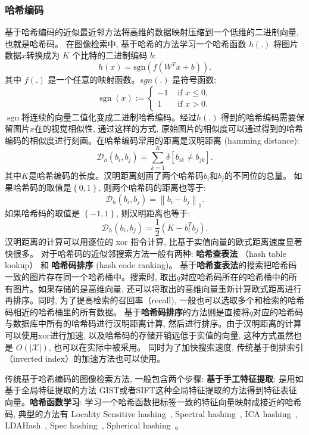 \subsubsection{哈希编码}
基于哈希编码的近似最近邻方法将高维的数据映射压缩到一个低维的二进制向量, 也就是哈希码。 在图像检索中, 基于哈希的方法学习一个哈希函数 $h(.)$  将图片数据$x$转换成为 $K$ 个比特的二进制编码 $b$:
\begin{equation}
    h(x) = \text{sgn}(f(W^Tx + b)).
\end{equation}
其中 $f(.)$ 是一个任意的映射函数。$sgn(.)$ 是符号函数:
\begin{equation}
    \operatorname{sgn} (x) := \begin{cases}-1 & \text { if } x \leq 0,  \\ 1 & \text { if } x>0. \end{cases}
\end{equation}
$\operatorname{sgn} $将连续的向量二值化变成二进制哈希编码。经过$h(.)$ 得到的哈希编码需要保留图片$x$在的视觉相似性, 通过这样的方式, 原始图片的相似度可以通过得到的哈希编码的相似度进行刻画。在哈希编码常用的距离是汉明距离 (hamming distance):
\begin{equation}
    \mathcal{D}_h(b_i, b_j) = \sum_{k = 1}^{K} \delta \left[b_{ik} \neq b_{jk} \right].
\end{equation}
其中$K$是哈希编码的长度。汉明距离刻画了两个哈希码$b_i$和$b_j$的不同位的总量。 如果哈希码的取值是$\left\{0, 1 \right\}$, 则两个哈希码的距离也等于:
\begin{equation}
    \mathcal{D}_h(b_i, b_j)=\left\|b_i - b_j\right\|_1.
\end{equation}
如果哈希码的取值是 $\left\{-1, 1\right\}$, 则汉明距离也等于:
\begin{equation}
    \mathcal{D}_h(b_i, b_j)= \frac{1}{2} \left ( K - b_i^Tb_j \right ).
\end{equation}
汉明距离的计算可以用逐位的 xor 指令计算, 比基于实值向量的欧式距离速度显著快很多。
对于哈希码的近似邻搜索方法一般有两种: \textbf{哈希查表法} （hash table lookup） 和 \textbf{哈希码排序} (hash code ranking)。 基于\textbf{哈希查表法}的搜索把哈希码一致的图片存在同一个哈希桶中。搜索时, 取出$q$对应哈希码所在的哈希桶中的所有图片。如果存储的是高维向量, 还可以将取出的高维向量重新计算欧式距离进行再排序。同时, 为了提高检索的召回率（recall), 一般也可以选取多个和检索的哈希码相近的哈希桶里的所有数据。 基于\textbf{哈希码排序}的方法则是直接将$q$对应的哈希码与数据库中所有的哈希码进行汉明距离计算, 然后进行排序。由于汉明距离的计算可以使用xor进行加速, 以及哈希码的存储开销远低于实值的向量, 这种方式虽然也是 $O(\left|\mathcal{X} \right|)$, 也可以在实际中被采用。 同时为了加快搜索速度, 传统基于倒排索引（inverted index）的加速方法也可以使用。 \par
传统基于哈希编码的图像检索方法, 一般包含两个步骤: \textbf{基于手工特征提取}: 是用如 基于全局特征提取的方法 GIST或者SIFT这种全局特征提取的方法得到特征表征向量。\textbf{哈希函数学习}: 学习一个哈希函数把标签一致的特征向量映射成接近的哈希码, 典型的方法有 Locality Sensitive hashing~\cite{charikar2002similarity}, Spectral hashing~\cite{weiss2008spectral}, ICA hashing~\cite{he2011compact}, LDAHash~\cite{strecha2011ldahash}, Spec hashing~\cite{lin2010spec}, Spherical hashing~\cite{heo2012spherical}。
